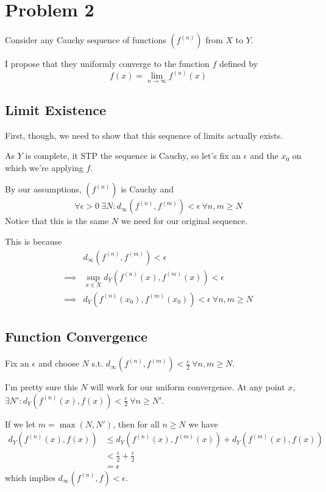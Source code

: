 \documentclass[12pt]{article}
\begin{document}
\section{Problem 2}\label{sec:p2}

Consider any Cauchy sequence of functions $\left(f^{(n)}\right)$ from $X$ to $Y$.

I propose that they uniformly converge to the function $f$ defined by
\[f(x)=\lim_{n \to \infty} f^{(n)}(x)\]

\subsection{Limit Existence}

First, though, we need to show that this sequence of limits actually exists.

As $Y$ is complete, it STP the sequence is Cauchy, so let's fix an $\epsilon$ and
the $x_0$ on which we're applying $f$.

By our assumptions, $\left(f^{(n)}\right)$ is Cauchy and
\[\forall \epsilon > 0\ \exists N: d_\infty\left(f^{(n)}, f^{(m)}\right) < \epsilon\ \forall n, m \ge N\]
Notice that this is the same $N$ we need for our original sequence.

This is because
\begin{align*}
    & d_\infty\left(f^{(n)}, f^{(m)}\right) < \epsilon \\
    \implies{} & \sup_{x \in X} d_Y\left(f^{(n)}(x), f^{(m)}(x)\right) < \epsilon \\
    \implies{} & d_Y\left(f^{(n)}(x_0), f^{(m)}(x_0)\right) < \epsilon\ \forall n, m \ge N
\end{align*}

\subsection{Function Convergence}

Fix an $\epsilon$ and choose $N$ s.t.
$d_\infty\left(f^{(n)}, f^{(m)}\right) < \frac{\epsilon}{2}\ \forall n, m \ge N$.

I'm pretty sure this $N$ will work for our uniform convergence.
At any point $x$, $\exists N': d_Y\left(f^{(n)}(x), f(x)\right) < \frac{\epsilon}{2}\ \forall n \ge N'$.

If we let $m=\max(N, N')$, then for all $n \ge N$ we have
\begin{align*}
    d_Y\left(f^{(n)}(x), f(x)\right)
    &\le d_Y\left(f^{(n)}(x), f^{(m)}(x)\right) + d_Y\left(f^{(m)}(x), f(x)\right) \\
    &< \frac{\epsilon}{2} + \frac{\epsilon}{2} \\
    &= \epsilon
\end{align*}
which implies $d_\infty\left(f^{(n)}, f\right) < \epsilon$.
\end{document}
